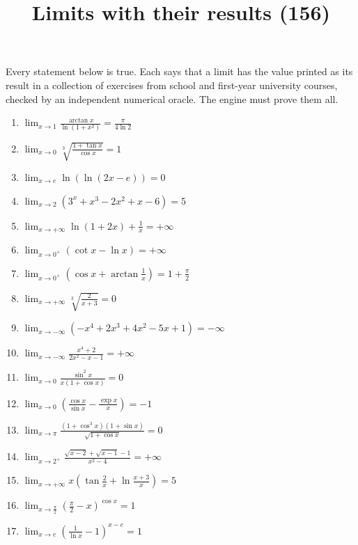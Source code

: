 \documentclass[11pt,a4paper]{article}
\title{Limits with their results (156)}
\author{}
\date{}
\begin{document}
\maketitle
Every statement below is true. Each says that a limit has the value printed as its result in a collection of exercises from school and first-year university courses, checked by an independent numerical oracle. The engine must prove them all.

\begin{enumerate}
\item $\displaystyle \lim_{x \to 1} \frac{\arctan x}{\ln(1 + x^{2})} = \frac{\pi}{4\ln 2}$
\item $\displaystyle \lim_{x \to 0} \sqrt[3]{\frac{1 + \tan x}{\cos x}} = 1$
\item $\displaystyle \lim_{x \to e} \ln\left(\ln(2x - e)\right) = 0$
\item $\displaystyle \lim_{x \to 2} (3^{x} + x^{3} - 2x^{2} + x - 6) = 5$
\item $\displaystyle \lim_{x \to +\infty} \ln(1 + 2x) + \frac{1}{x} = +\infty$
\item $\displaystyle \lim_{x \to 0^{+}} (\cot x - \ln x) = +\infty$
\item $\displaystyle \lim_{x \to 0^{+}} \left(\cos x + \arctan\frac{1}{x}\right) = 1 + \frac{\pi}{2}$
\item $\displaystyle \lim_{x \to +\infty} \sqrt[3]{\frac{2}{x + 3}} = 0$
\item $\displaystyle \lim_{x \to -\infty} (-x^{4} + 2x^{3} + 4x^{2} - 5x + 1) = -\infty$
\item $\displaystyle \lim_{x \to -\infty} \frac{x^{4} + 2}{2x^{2} - x - 1} = +\infty$
\item $\displaystyle \lim_{x \to 0} \frac{\sin^{2} x}{x(1 + \cos x)} = 0$
\item $\displaystyle \lim_{x \to 0} \left(\frac{\cos x}{\sin x} - \frac{\exp x}{x}\right) = -1$
\item $\displaystyle \lim_{x \to \pi} \frac{(1 + \cos^{3} x)(1 + \sin x)}{\sqrt{1 + \cos x}} = 0$
\item $\displaystyle \lim_{x \to 2^{+}} \frac{\sqrt{x - 2} + \sqrt{x - 1} - 1}{x^{2} - 4} = +\infty$
\item $\displaystyle \lim_{x \to +\infty} x\left(\tan\frac{2}{x} + \ln\frac{x + 3}{x}\right) = 5$
\item $\displaystyle \lim_{x \to \frac{\pi}{2}} \left(\frac{\pi}{2} - x\right)^{\cos x} = 1$
\item $\displaystyle \lim_{x \to e} \left(\frac{1}{\ln x} - 1\right)^{x - e} = 1$

\end{enumerate}
\end{document}
